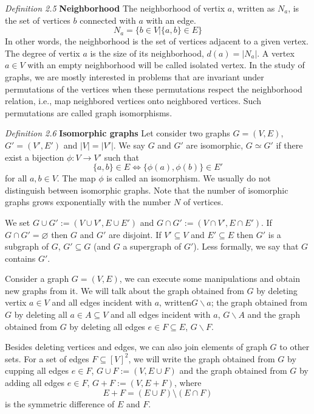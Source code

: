 \documentclass[10pt,a4paper]{book}
\numberwithin{equation}{chapter}
\numberwithin{figure}{chapter}
\numberwithin{table}{chapter}
\begin{document}
\textit{Definition 2.5} \textbf{Neighborhood} The neighborhood of vertix $a$, written as $N_a$, is the set of vertices $b$ connected with $a$ with an edge. 
\begin{equation}
N_{a}= \lbrace b \in V | \lbrace a,b \rbrace \in E \rbrace
\end{equation}
In other words, the neighborhood is the set of vertices adjacent to a given vertex. The degree of vertix $a$ is the size of its neighborhood, $d(a)= |N_a|$. A vertex $a\in V$ with an empty neighborhood will be called isolated vertex.
In the study of graphs, we are mostly interested in problems that are invariant under permutations of the vertices when these permutations respect the neighborhood relation, i.e., map neighbored vertices onto neighbored vertices. Such permutations are called graph isomorphisms.

\textit{Definition 2.6} \textbf{Isomorphic graphs}  Let consider two graphs $ G= (V,E)$, $G'=(V',E')$ and $|V|=|V'|$. We say $G$ and $G'$ are isomorphic, $G\simeq G'$ if there exist a bijection $\phi : V\rightarrow V'$ such that
\begin{equation}
\lbrace a,b \rbrace \in E \Longleftrightarrow \lbrace \phi(a),\phi(b)\rbrace \in E'
\end{equation}
for all $a,b \in V$. The map $\phi$ is called an isomorphism. We usually do not distinguish between isomorphic graphs. Note that the number of isomorphic graphs grows exponentially with the number $N$ of vertices.

We set $G\cup G' := (V \cup V', E \cup E')$ and $G\cap G' := (V \cap V', E \cap E')$.
If $G\cap G'= \varnothing$ then $G$ and $G'$ are disjoint. If $V'\subseteq V$ and $E'\subseteq E$ then $G'$ is a subgraph of $G$, $G'\subseteq G$ (and $G$ a supergraph of $G'$). Less formally, we say that $G$ contains $G'$.

Consider a graph $G=(V,E)$, we can execute some manipulations and obtain new graphs from it. We will talk about the graph obtained from $G$ by deleting vertix $a \in V$ and all edges incident with $a$, written$G \backslash a$; the graph obtained from $G$ by deleting all $a \in A\subseteq V$ and all edges incident with $a$, $G \backslash A$ and the graph obtained from $G$ by deleting all edges $e \in F\subseteq E$, $G \backslash F$. 

Besides deleting vertices and edges, we can also join elements of graph $G$ to other sets. For a set of edges $F \subseteq [V]^2$, we will write the graph obtained from $G$ by cupping all edges $e \in F$, $G \cup F:= (V, E \cup F)$ and the graph obtained from $G$ by adding all edges $e \in F$, $ G + F:= (V,E + F)$, where
\begin{equation}
E + F = (E \cup F )\setminus(E \cap F )
\end{equation}
is the symmetric difference of $E$ and $F$.
\end{document}
